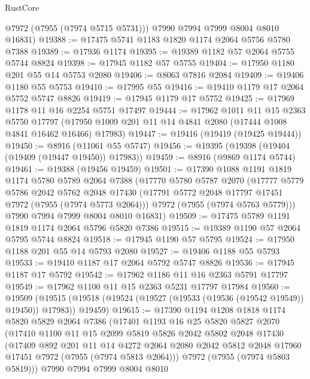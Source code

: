 \begin{lexlean}{RustCore}
\begin{coremodule}
        @7972
        (@7955 (@7974 @5715 @5731)))
      @7990
      @7994
      @7999
      @8004
      @8010
      @16831)
@19388 := @17475 @5741 @1183 @1820 @1174 @2064 @5756 @5780 @7388
@19389 := @17936 @1174
@19395 := @19389 @1182 @57 @2064 @5755 @5744 @8824
@19398 := @17945 @1182 @57 @5755
@19404 := @17950 @1180 @201 @55 @14 @5753 @2080
@19406 := @8063 @7816 @2084
@19409 := @19406 @1180 @55 @5753
@19410 := @17995 @55
@19416 := @19410 @1179 @17 @2064 @5752 @5747 @8826
@19419 := @17945 @1179 @17 @5752
@19425 := @17969 @1178 @11 @16 @2254 @5751 @17497
@19444 := @17962
    @1011
    @11
    @15
    @2363
    @5750
    @17797
    (@17950 @1009 @201 @11 @14 @4841 @2080 (@17444 @1008 @4841 @16462 @16466) @17983)
@19447 := @19416 (@19419 (@19425 @19444))
@19450 := @8916 (@11061 @55 @5747)
@19456 := @19395 (@19398 (@19404 (@19409 (@19447 @19450)) @17983))
@19459 := @8916 (@9869 @1174 @5744)
@19461 := @19388 (@19456 @19459)
@19501 := @17390
    @1088
    @1191
    @1819
    @1174
    @5780
    @5789
    @2064
    @7388
    (@17770
      @5780
      @5787
      @2070
      (@17777
        @5779
        @5786
        @2042
        @5762
        @2048
        @17430
        (@17791 @5772 @2048 @17797 @17451 @7972 (@7955 (@7974 @5773 @2064)))
        @7972
        (@7955 (@7974 @5763 @5779)))
      @7990
      @7994
      @7999
      @8004
      @8010
      @16831)
@19509 := @17475 @5789 @1191 @1819 @1174 @2064 @5796 @5820 @7386
@19515 := @19389 @1190 @57 @2064 @5795 @5744 @8824
@19518 := @17945 @1190 @57 @5795
@19524 := @17950 @1188 @201 @55 @14 @5793 @2080
@19527 := @19406 @1188 @55 @5793
@19533 := @19410 @1187 @17 @2064 @5792 @5747 @8826
@19536 := @17945 @1187 @17 @5792
@19542 := @17962 @1186 @11 @16 @2363 @5791 @17797
@19549 := @17962 @1100 @11 @15 @2363 @5231 @17797 @17984
@19560 := @19509
    (@19515 (@19518 (@19524 (@19527 (@19533 (@19536 (@19542 @19549)) @19450)) @17983)) @19459)
@19615 := @17390
    @1194
    @1208
    @1818
    @1174
    @5820
    @5829
    @2064
    @7386
    (@17401
      @1193
      @16
      @25
      @5820
      @5827
      @2070
      (@17410
        @1100
        @11
        @15
        @2099
        @5819
        @5826
        @2042
        @5802
        @2048
        @17430
        (@17409
          @892
          @201
          @11
          @14
          @4272
          @2064
          @2080
          @2042
          @5812
          @2048
          @17960
          @17451
          @7972
          (@7955 (@7974 @5813 @2064)))
        @7972
        (@7955 (@7974 @5803 @5819)))
      @7990
      @7994
      @7999
      @8004
      @8010

\end{coremodule}
\end{lexlean}
